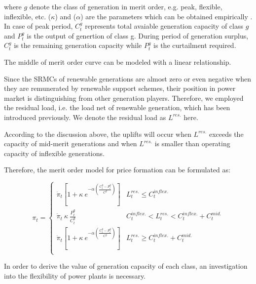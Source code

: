 where $g$ denote the class of generation in merit order, e.g. peak, flexible, inflexible, etc. ($\kappa$) and ($\alpha$) are the parameters which can be obtained empirically \cite{Cox2009}. In case of peak period, $C^g_t$ represents total avaiable generation capacity of class $g$ and $P^g_t$ is the output of genertion of class g. During period of generation surplus, $C^g_t$ is the remaining generation capacity while $P^g_t$ is the curtailment required.

The middle of merit order curve can be modeled with a linear relationship.

Since the SRMCs of renewable generations are almost zero or even negative when they are remunerated by renewable support schemes, their position in power market is distinguishing from other generation players. Therefore, we employed the residual load, i.e. the load net of renewable generation, which has been introduced previously. We denote the residual load as $L^{res.}$ here.

According to the discussion above, the uplifts will occur when $L^{res.}$ exceeds the capacity of mid-merit generations and when $L^{res.}$ is smaller than operating capacity of inflexible generations.

Therefore, the merit order model for price formation can be formulated as:

\begin{equation}
\label{eq:merit-order-model}
\pi_t = \begin{cases}
\dot{\pi}_t \left[1 + \kappa~e^{-\alpha\left(\frac{C_t^g -P^g_t }{C^g}\right)} \right] & L^{res.}_t \leq C^{inflex.}_t\\ 
\dot{\pi}_t ~\kappa~\frac{P^g_t}{C_t^g} & C^{inflex.}_t < L^{res.}_t < C^{inflex.}_t+ C^{mid.}_t\\
\dot{\pi}_t  \left[1 + \kappa~e^{-\alpha\left(\frac{C_t^g -P^g_t }{C^g}\right)} \right] & L^{res.}_t \geq C^{inflex.}_t + C^{mid.}_t\\
\end{cases}
\end{equation}

In order to derive the value of generation capacity of each class, an investigation into the flexibility of power plants is necessary.

